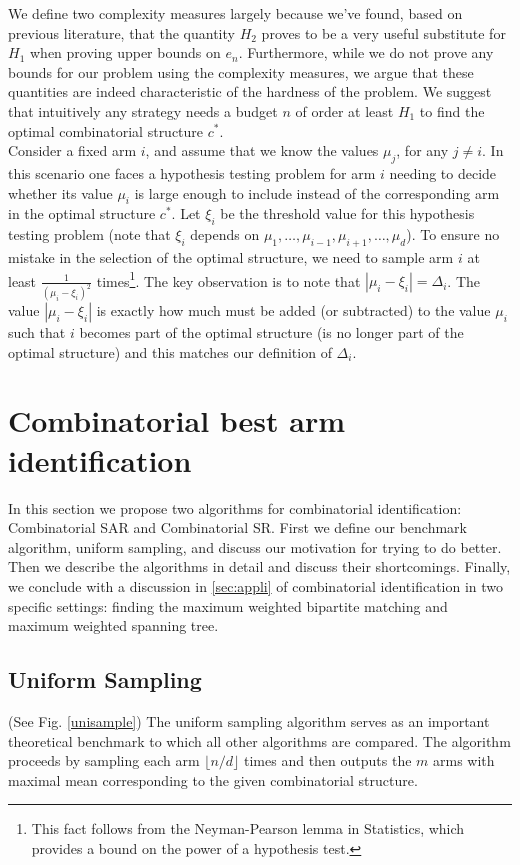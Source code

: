 \documentclass[11.75pt,oneside]{amsart}
\begin{document}
We define two complexity measures largely because we've found, based on previous literature, that the quantity $H_2$ proves to be a very useful substitute for $H_1$ when proving upper bounds on $e_n$. Furthermore, while we do not prove any bounds for our problem using the complexity measures, we argue that these quantities are indeed characteristic of the hardness of the problem. We suggest that intuitively any strategy needs a budget $n$ of order at least $H_1$ to find the optimal combinatorial structure $c^*$.\\
  
Consider a fixed arm $i$, and assume that we know the values $\mu_j$, for any $j \neq i$. In this scenario one faces a hypothesis testing problem for arm $i$ needing to decide whether its value $\mu_i$ is large enough to include instead of the corresponding arm in the optimal structure $c^*$. Let $\xi_i$ be the threshold value for this hypothesis testing problem (note that $\xi_i$ depends on $\mu_1, \hdots, \mu_{i-1}, \mu_{i+1}, \hdots, \mu_d$). To ensure no mistake in the selection of the optimal structure, we need to sample arm $i$ at least $\frac{1}{(\mu_i - \xi_i)^{2}}$ times\footnote{This fact follows from the Neyman-Pearson lemma in Statistics, which provides a bound on the power of a hypothesis test.}. The key observation is to note that $|\mu_i - \xi_i| = \Delta_i$. The value $|\mu_i - \xi_i|$ is exactly how much must be added (or subtracted) to the value $\mu_i$ such that $i$ becomes part of the optimal structure (is no longer part of the optimal structure) and this matches our definition of $\Delta_i$.\\

\section{Combinatorial best arm identification} \label{sec:combib}
In this section we propose two algorithms for combinatorial identification: Combinatorial SAR and Combinatorial SR. First we define our benchmark algorithm, uniform sampling, and discuss our motivation for trying to do better. Then we describe the algorithms in detail and discuss their shortcomings. Finally, we conclude with a discussion in \ref{sec:appli} of combinatorial identification in two specific settings: finding the maximum weighted bipartite matching and maximum weighted spanning tree.\\

\subsection{Uniform Sampling} (See Fig. \ref{unisample})
The uniform sampling algorithm serves as an important theoretical benchmark to which all other algorithms are compared. The algorithm proceeds by sampling each arm $\lfloor n/d \rfloor$ times and then outputs the $m$ arms with maximal mean corresponding to the given combinatorial structure.\\
\end{document}
